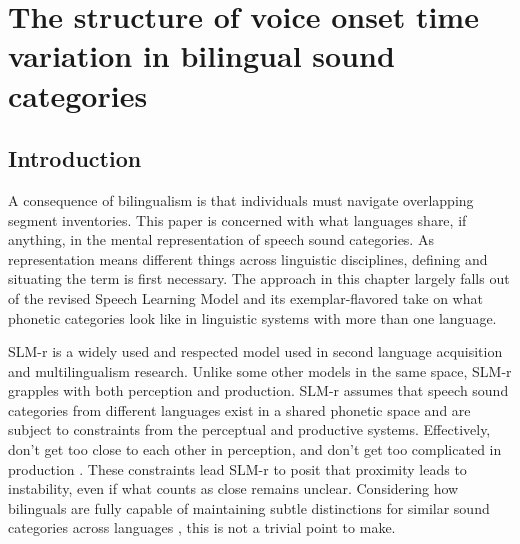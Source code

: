\setcounter{chapter}{3}

\chapter{The structure of voice onset time variation in bilingual sound categories}

\label{Uniformity}

\section{Introduction} %
A consequence of bilingualism is that individuals must navigate overlapping segment inventories. This paper is concerned with what languages share, if anything, in the mental representation of speech sound categories. As representation means different things across linguistic disciplines, defining and situating the term is first necessary. The approach in this chapter largely falls out of the revised Speech Learning Model \citep[SLM-r;][]{flege_2021_slmr} and its exemplar-flavored take on what phonetic categories look like in linguistic systems with more than one language. 

SLM-r is a widely used and respected model used in second language acquisition and multilingualism research. Unlike some other models in the same space, SLM-r grapples with both perception and production. SLM-r assumes that speech sound categories from different languages exist in a shared phonetic space and are subject to constraints from the perceptual and productive systems. Effectively, don't get too close to each other in perception, and don't get too complicated in production \citep{guion_2003_systems, lindblom_1988_universals, flege_1995_slm}. These constraints lead SLM-r to posit that proximity leads to instability, even if what counts as close remains unclear. Considering how bilinguals are fully capable of maintaining subtle distinctions for similar sound categories across languages \citep[e.g.,][]{sundara_2006_production}, this is not a trivial point to make. 

